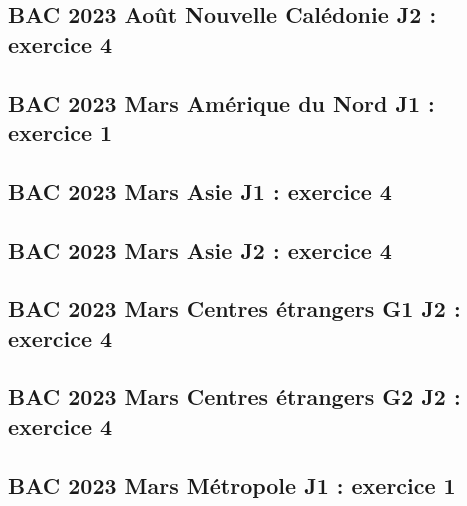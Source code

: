 \documentclass[lang=fr,edition=teacher,layout=sheet]{mxbook}
\begin{document}
\begingroup\endgroup
\par\bigskip
{}\subsection*{BAC 2023 Août Nouvelle Calédonie J2 : exercice 4}
\begingroup\endgroup
\par\bigskip
{}\subsection*{BAC 2023 Mars Amérique du Nord J1 : exercice 1}
\begingroup\endgroup
\par\bigskip
{}\subsection*{BAC 2023 Mars Asie J1 : exercice 4}
\begingroup\endgroup
\par\bigskip
{}\subsection*{BAC 2023 Mars Asie J2 : exercice 4}
\begingroup\endgroup
\par\bigskip
{}\subsection*{BAC 2023 Mars Centres étrangers G1 J2 : exercice 4}
\begingroup\endgroup
\par\bigskip
{}\subsection*{BAC 2023 Mars Centres étrangers G2 J2 : exercice 4}
\begingroup\endgroup
\par\bigskip
{}\subsection*{BAC 2023 Mars Métropole J1 : exercice 1}
\end{document}
